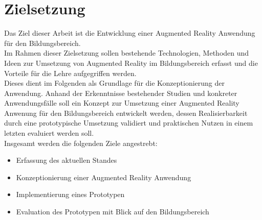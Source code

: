 \section{Zielsetzung}\label{sec:ziele}
Das Ziel dieser Arbeit ist die Entwicklung einer Augmented Reality Anwendung für den Bildungsbereich. \\
Im Rahmen dieser Zielsetzung sollen bestehende Technologien, Methoden und Ideen zur Umsetzung von Augmented Reality im Bildungsbereich erfasst und die Vorteile für die Lehre aufgegriffen werden. \\
Dieses dient im Folgenden als Grundlage für die Konzeptionierung der Anwendung. Anhand der Erkenntnisse bestehender Studien und konkreter Anwendungsfälle soll ein Konzept zur Umsetzung einer Augmented Reality Anwenung für den Bildungsbereich entwickelt werden, dessen Realisierbarkeit durch eine prototypische Umsetzung validiert und praktischen Nutzen in einem letzten evaluiert werden soll.\\
Insgesamt werden die folgenden Ziele angestrebt:
\begin{itemize}
\item Erfassung des aktuellen Standes
\item Konzeptionierung einer Augmented Reality Anwendung
\item Implementierung eines Prototypen
\item Evaluation des Prototypen mit Blick auf den Bildungsbereich
\end{itemize}


